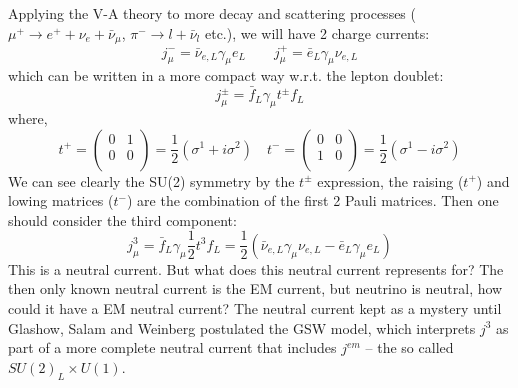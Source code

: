 Applying the V-A theory to more decay and scattering processes 
( $\mu^+ \rightarrow e^+ + \nu_e + \bar{\nu}_\mu$, $\pi^- \rightarrow l + \bar{\nu}_l$ etc.), 
we will have 2 charge currents:
\begin{equation}
    j_\mu^- = \bar{\nu}_{e, L} \gamma_\mu e_L	\qquad 
    j_\mu^+ = \bar{e}_L \gamma_\mu \nu_{e,L}
\end{equation}
which can be written in a more compact way w.r.t. the lepton doublet:
\begin{equation}
    j_\mu^\pm = \bar{f}_L \gamma_\mu t^\pm f_L
\end{equation}
where,
\begin{equation}
    t^+  =
    \begin{pmatrix}
	0   & 1	\\
	0   & 0	\\
    \end{pmatrix}
    = \frac{1}{2}(\sigma^1 + i\sigma^2)
    \quad
    t^-  =
    \begin{pmatrix}
	0   & 0	\\
	1   & 0	\\
    \end{pmatrix}
    = \frac{1}{2}(\sigma^1 - i\sigma^2)
\end{equation}
We can see clearly the SU(2) symmetry by the $t^\pm$ expression, the raising ($t^+$)
and lowing matrices ($t^-$) are the combination of the first 2 Pauli matrices.
Then one should consider the third component:
\begin{equation}
    j_\mu^3 = \bar{f}_L \gamma_\mu \frac{1}{2}t^3 f_L = \frac{1}{2} (\bar{\nu}_{e, L} \gamma_\mu \nu_{e, L} - \bar{e}_{L} \gamma_\mu e_L)
\end{equation}
This is a neutral current. But what does this neutral current represents for?
The then only known neutral current is the EM current, but neutrino is neutral, how
could it have a EM neutral current? The neutral current kept as a mystery until
Glashow, Salam and Weinberg postulated the GSW model, which interprets $j^3$ as
part of a more complete neutral current that includes $j^{em}$ -- the so called
$SU(2)_L \times U(1)$.

